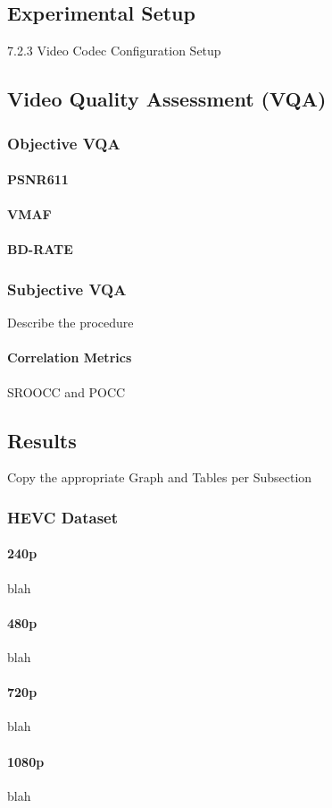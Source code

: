 \documentclass{ieeeaccess}
\begin{document}
\subsection{Experimental Setup}
7.2.3 Video Codec Configuration Setup
\subsection{Video Quality Assessment (VQA)}
\subsubsection{Objective VQA}
\paragraph{PSNR611}
\paragraph{VMAF}
\paragraph{BD-RATE}
\subsubsection{Subjective VQA}
Describe the procedure
\paragraph{Correlation Metrics}
SROOCC and POCC

\subsection{Results}
Copy the appropriate Graph and Tables per Subsection
\subsubsection{HEVC Dataset}
\paragraph{240p}
blah
\paragraph{480p}
blah
\paragraph{720p}
blah
\paragraph{1080p}
blah
\end{document}
